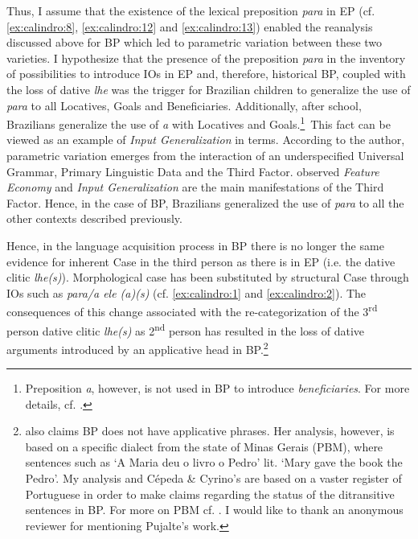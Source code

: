 \documentclass[output=paper,colorlinks,citecolor=brown]{./langscibook}
\begin{document}
Thus, I assume that the existence of the lexical preposition \textit{para} in EP (cf. \ref{ex:calindro:8}, \ref{ex:calindro:12} and \ref{ex:calindro:13}) enabled the reanalysis discussed above for BP which led to parametric variation between these two varieties. I hypothesize that the presence of the preposition \textit{para} in the inventory of possibilities to introduce IOs in EP and, therefore, historical BP, coupled with the loss of dative \textit{lhe} was the trigger for Brazilian children to generalize the use of \textit{para} to all Locatives, Goals and Beneficiaries. Additionally, after school, Brazilians generalize the use of \textit{a} with Locatives and Goals.\footnote{Preposition \textit{a}, however, is not used in BP to introduce \textit{beneficiaries}. For more details, cf. \citet{Calindro2015}.}~This fact can be viewed as an example of \textit{Input Generalization} in  terms. According to the author, parametric variation emerges from the interaction of an underspecified Universal Grammar, Primary Linguistic Data and the Third Factor. \citet{BiberauerRoberts2015} observed \textit{Feature Economy} and \textit{Input Generalization} are the main manifestations of the Third Factor. Hence, in the case of BP, Brazilians generalized the use of \textit{para} to all the other contexts described previously.

Hence, in the language acquisition process in BP there is no longer the same evidence for inherent Case in the third person as there is in EP (i.e. the dative clitic \textit{lhe(s)}). Morphological case has been substituted by structural Case through IOs such as \textit{para/a ele (a)(s)} (cf. \ref{ex:calindro:1} and \ref{ex:calindro:2}). The consequences of this change associated with the re-categorization of the 3\textsuperscript{rd} person dative clitic \textit{lhe(s)} as 2\textsuperscript{nd} person has resulted in the loss of dative arguments introduced by an applicative head in BP.\footnote{\citet{Pujalte2010} also claims BP does not have applicative phrases. Her analysis, however, is based on a specific dialect from the state of Minas Gerais (PBM), where sentences such as ‘A Maria deu o livro o Pedro’ lit. ‘Mary gave the book the Pedro’. My analysis and Cépeda \& Cyrino’s are based on a vaster register of Portuguese in order to make claims regarding the status of the ditransitive sentences in BP. For more on PBM cf. \citet{Scher1996, TorresMoraisSalles2010}. I would like to thank an anonymous reviewer for mentioning Pujalte’s work.}
\end{document}
